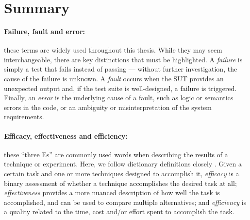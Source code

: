 \section{Summary}\label{sec:background_summary}

\paragraph{Failure, fault and error: } these terms are widely used throughout this thesis.
While they may seem interchangeable, there are key distinctions that must be highlighted.
A \textit{failure} is simply a test that fails instead of passing — without further investigation, the cause of the failure is unknown.
A \textit{fault} occurs when the SUT provides an unexpected output and, if the test suite is well-designed, a failure is triggered.
Finally, an \textit{error} is the underlying cause of a fault, such as logic or semantics errors in the code, or an ambiguity or misinterpretation of the system requirements.

\paragraph{Efficacy, effectiveness and efficiency: } these ``three Es'' are commonly used words when describing the results of a technique or experiment.
Here, we follow dictionary definitions closely \cite{dictionary_eff}.
Given a certain task and one or more techniques designed to accomplish it,
\textit{efficacy} is a binary assessment of whether a technique accomplishes the desired task at all;
\textit{effectiveness} provides a more nuanced description of how well the task is accomplished, and can be used to compare multiple alternatives; and
\textit{efficiency} is a quality related to the time, cost and/or effort spent to accomplish the task.